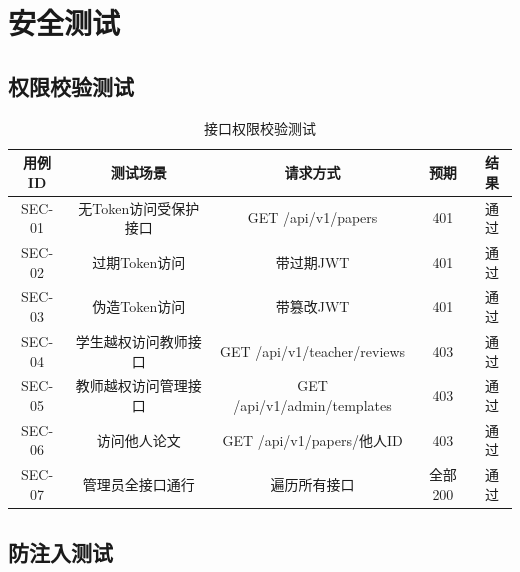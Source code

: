 
\section{安全测试}

\subsection{权限校验测试}

\begin{table}[htbp]
    \centering
    \caption{接口权限校验测试}
    \begin{tabular}{|c|c|c|c|c|}
        \hline
        \textbf{用例ID} & \textbf{测试场景} & \textbf{请求方式} & \textbf{预期} & \textbf{结果} \\
        \hline
        SEC-01 & 无Token访问受保护接口 & GET /api/v1/papers & 401 & 通过 \\
        \hline
        SEC-02 & 过期Token访问 & 带过期JWT & 401 & 通过 \\
        \hline
        SEC-03 & 伪造Token访问 & 带篡改JWT & 401 & 通过 \\
        \hline
        SEC-04 & 学生越权访问教师接口 & GET /api/v1/teacher/reviews & 403 & 通过 \\
        \hline
        SEC-05 & 教师越权访问管理接口 & GET /api/v1/admin/templates & 403 & 通过 \\
        \hline
        SEC-06 & 访问他人论文 & GET /api/v1/papers/他人ID & 403 & 通过 \\
        \hline
        SEC-07 & 管理员全接口通行 & 遍历所有接口 & 全部200 & 通过 \\
        \hline
    \end{tabular}
\end{table}

\subsection{防注入测试}

